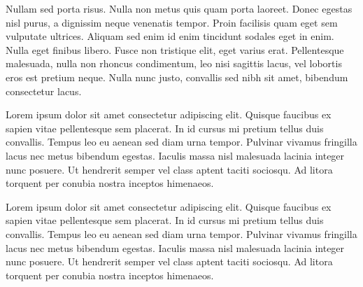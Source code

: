Nullam sed porta risus. Nulla non metus quis quam porta laoreet. Donec egestas nisl purus, a dignissim neque venenatis tempor. Proin facilisis quam eget sem vulputate ultrices. Aliquam sed enim id enim tincidunt sodales eget in enim. Nulla eget finibus libero. Fusce non tristique elit, eget varius erat. Pellentesque malesuada, nulla non rhoncus condimentum, leo nisi sagittis lacus, vel lobortis eros est pretium neque. Nulla nunc justo, convallis sed nibh sit amet, bibendum consectetur lacus.

Lorem ipsum dolor sit amet consectetur adipiscing elit. Quisque faucibus ex sapien vitae pellentesque sem placerat. In id cursus mi pretium tellus duis convallis. Tempus leo eu aenean sed diam urna tempor. Pulvinar vivamus fringilla lacus nec metus bibendum egestas. Iaculis massa nisl malesuada lacinia integer nunc posuere. Ut hendrerit semper vel class aptent taciti sociosqu. Ad litora torquent per conubia nostra inceptos himenaeos.

Lorem ipsum dolor sit amet consectetur adipiscing elit. Quisque faucibus ex sapien vitae pellentesque sem placerat. In id cursus mi pretium tellus duis convallis. Tempus leo eu aenean sed diam urna tempor. Pulvinar vivamus fringilla lacus nec metus bibendum egestas. Iaculis massa nisl malesuada lacinia integer nunc posuere. Ut hendrerit semper vel class aptent taciti sociosqu. Ad litora torquent per conubia nostra inceptos himenaeos.
\null